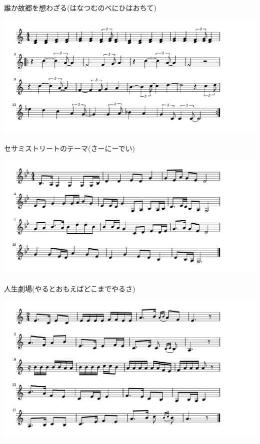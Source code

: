 \documentclass[a4paper]{ltjsarticle}
\begin{document}
\vspace{-10mm} \hspace{10mm}
誰か故郷を想わざる(はなつむのべにひはおちて)

\includegraphics[clip]{sesamistreet_crop.pdf}

\vspace{-10mm} \hspace{10mm}
セサミストリートのテーマ(さーにーでい)

\includegraphics[clip]{jinseigekijo_crop.pdf}

\vspace{-10mm} \hspace{10mm}
人生劇場(やるとおもえばどこまでやるさ)

\includegraphics[clip]{wakaiomawari_crop.pdf}
\end{document}
